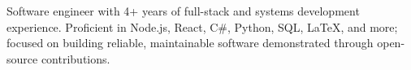 
\begin{resume-objective}
Software engineer with 4+ years of full-stack and systems development experience. 
Proficient in Node.js, React, C\#, Python, SQL, \LaTeX, and more; focused on building 
reliable, maintainable software demonstrated through open-source contributions.
\end{resume-objective}



